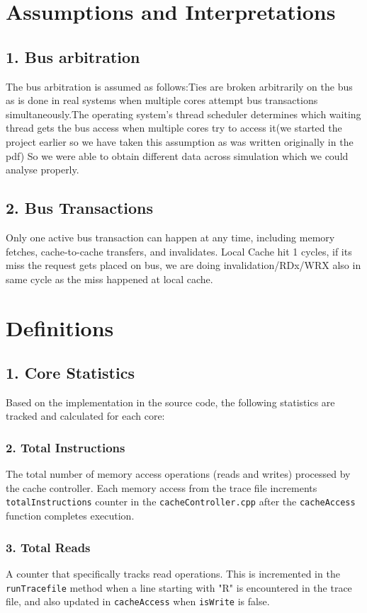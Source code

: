 \documentclass[11pt]{article}
\begin{document}
\section{Assumptions and Interpretations}
\subsection*{1. Bus arbitration}
The bus arbitration is assumed as follows:Ties are broken arbitrarily on the bus as is done in real systems when multiple cores attempt bus transactions simultaneously.The operating system's thread scheduler determines which waiting thread gets the bus access when multiple cores try to access it(we started the project earlier so we have taken this assumption as was written originally in the pdf) So we were able to obtain different data across simulation which we could analyse properly.


\subsection*{2. Bus Transactions}
Only one active bus transaction can happen at any time, including memory
fetches, cache-to-cache transfers, and invalidates. Local Cache hit 1 cycles,
if its miss the request gets placed on bus, we are doing invalidation/RDx/WRX also in same cycle
as the miss happened at local cache.


\section{Definitions}

\subsection*{1. Core Statistics}

Based on the implementation in the source code, the following statistics are tracked and calculated for each core:

\subsubsection*{2. Total Instructions}
The total number of memory access operations (reads and writes) processed by the cache controller. Each memory access from the trace file increments \texttt{totalInstructions} counter in the \texttt{cacheController.cpp} after the \texttt{cacheAccess} function completes execution.

\subsubsection*{3. Total Reads}
A counter that specifically tracks read operations. This is incremented in the \texttt{runTracefile} method when a line starting with "R" is encountered in the trace file, and also updated in \texttt{cacheAccess} when \texttt{isWrite} is false.
\end{document}
